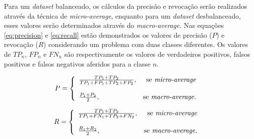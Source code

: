 Para um \emph{dataset} balanceado, os cálculos da precisão e revocação serão realizados através da técnica de \emph{micro-average}, enquanto para um \emph{dataset} desbalanceado, esses valores serão determinados através do \emph{macro-average}. Nas equações \ref{eq:precision} e \ref{eq:recall} estão demonstrados os valores de precisão ($P$) e revocação ($R$) considerando um problema com duas classes diferentes. Os valores de $TP_n$, $FP_n$ e $FN_n$ são respectivamente os valores de verdadeiros positivos, falsos positivos e falsos negativos aferidos para a classe $n$.

\begin{equation}
\label{eq:precision}
P = \left\{
\begin{array}{lr}
  \frac{TP_1 + TP_2}{TP_1 + FP_1 + TP_2 + FP_2}, & \text{se \emph{micro-average}}\\
  \\
  \frac{P_1 + P_2}{2}, & \text{se \emph{macro-average}}.
\end{array}
\right.
\end{equation}

\begin{equation}
\label{eq:recall}
R = \left\{
\begin{array}{lr}
  \frac{TP_1 + TP_2}{TP_1 + FN_1 + TP_2 + FN_2}, & \text{se \emph{micro-average}}\\
  \\
  \frac{R_1 + R_2}{2}, & \text{se \emph{macro-average}}.
\end{array}
\right.
\end{equation}
